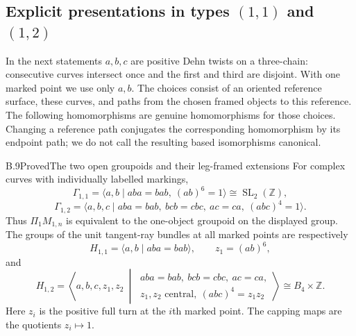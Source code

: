 \subsection{Explicit presentations in types $(1,1)$ and $(1,2)$}

In the next statements $a,b,c$ are positive Dehn twists on a
three-chain: consecutive curves intersect once and the first and
third are disjoint.  With one marked point we use only $a,b$.
The choices consist of an oriented reference surface, these curves,
and paths from the chosen framed objects to this reference.  The
following homomorphisms are genuine homomorphisms for those choices.
Changing a reference path conjugates the corresponding
homomorphism by its endpoint path; we do not call the resulting
based isomorphisms canonical.

\begin{result}{B.9}{Proved}{The two open groupoids and their leg-framed extensions}
For complex curves with individually labelled markings,
\[
 \Gamma_{1,1}=\langle a,b\mid aba=bab,\ (ab)^6=1\rangle
                 \cong\operatorname{SL}_2(\mathbb Z),
 \tag{B.8}
\]
\[
 \Gamma_{1,2}=\langle a,b,c\mid aba=bab,\ bcb=cbc,
               \ ac=ca,\ (abc)^4=1\rangle.
 \tag{B.9}
\]
Thus $\Pi_1M_{1,n}$ is equivalent to the one-object groupoid on the
displayed group.  The groups of the unit tangent-ray bundles at
all marked points are respectively
\[
 H_{1,1}=\langle a,b\mid aba=bab\rangle,
       \qquad z_1=(ab)^6,
 \tag{B.10}
\]
and
\[
 H_{1,2}=\left\langle a,b,c,z_1,z_2\ \middle|\
 \begin{array}{l}
 aba=bab,\ bcb=cbc,\ ac=ca,\\
 z_1,z_2\text{ central},\ (abc)^4=z_1z_2
 \end{array}\right\rangle
 \cong B_4\times\mathbb Z.
 \tag{B.11}
\]
Here $z_i$ is the positive full turn at the $i$th marked point.
The capping maps are the quotients $z_i\mapsto1$.
\end{result}
